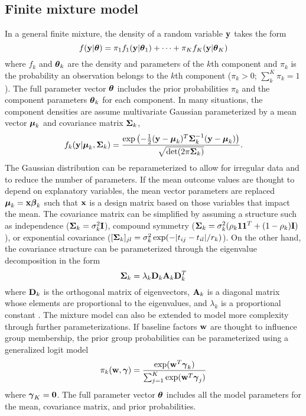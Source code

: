 \subsection{Finite mixture model}
In a general finite mixture, the density of a random variable $\mathbf y$ takes the form
$$f(\mathbf y|\boldsymbol\theta)=\pi_{1}f_{1}(\mathbf y|\boldsymbol\theta_1)+\cdots+\pi_{K}f_{K}(\mathbf y|\boldsymbol\theta_K)$$
where $f_k$ and $\boldsymbol\theta_k$ are the density and parameters of the $k$th component and $\pi_{k}$ is the probability an observation belongs to the $k$th component ($\pi_{k}>0$; $\sum^{K}_{k}\pi_{k}=1$). The full parameter vector $\boldsymbol\theta$ includes the prior probabilities $\pi_k$ and the component parameters $\boldsymbol\theta_k$ for each component. In many situations, the component densities are assume multivariate Gaussian parameterized by a mean vector $\boldsymbol\mu_{k}$ and covariance matrix $\boldsymbol\Sigma_{k}$,
$$f_k(\mathbf y| \boldsymbol\mu_k,\boldsymbol\Sigma_k) = \frac{\exp\left(-\frac{1}{2}(\mathbf y - \boldsymbol\mu_k)^T\boldsymbol\Sigma_k^{-1}(\mathbf y-\boldsymbol\mu_k)\right)}{\sqrt{\det(2\pi \boldsymbol\Sigma_k)}}.$$
The Gaussian distribution can be reparameterized to allow for irregular data and to reduce the number of parameters. If the mean outcome values are thought to depend on explanatory variables, the mean vector parameters are replaced $\boldsymbol\mu_k = \mathbf x \boldsymbol \beta_k$ such that $\mathbf x$ is a design matrix based on those variables that impact the mean. The covariance matrix can be simplified by assuming a structure such as independence ($\boldsymbol\Sigma_{k}=\sigma^{2}_{k}\mathbf I$), compound symmetry ($\boldsymbol\Sigma_{k}=\sigma^{2}_{k}(\rho_{k}\mathbf1\mathbf1^{T}+(1-\rho_{k})\mathbf I)$), or exponential covariance  ($[\mathbf \Sigma_{k}]_{jl} = \sigma_{k}^{2}\exp(-| t_{ij}-t_{il}| / r_{k})$). On the other hand, the covariance structure can be parameterized through the eigenvalue decomposition in the form
$$\boldsymbol\Sigma_k=\lambda_k \mathbf D_k\mathbf A_k\mathbf D_k^T$$
where $\mathbf D_k$ is the orthogonal matrix of eigenvectors, $\mathbf A_k$ is a diagonal matrix whose elements are proportional to the eigenvalues, and $\lambda_k$ is a proportional constant \cite{banfield1993}. The mixture model can also be extended to model more complexity through further parameterizations. If baseline factors $\mathbf w$ are thought to influence group membership, the prior group probabilities can be parameterized using a generalized logit model
$$\pi_k(\mathbf w,\boldsymbol\gamma)= \frac{\exp(\mathbf w^T \boldsymbol \gamma_k) }{\sum_{j=1}^K \exp(\mathbf w^T \boldsymbol \gamma_j)}$$
where $\boldsymbol\gamma_{K}=\mathbf 0$. The full parameter vector $\boldsymbol\theta$ includes all the model parameters for the mean, covariance matrix, and prior probabilities.


